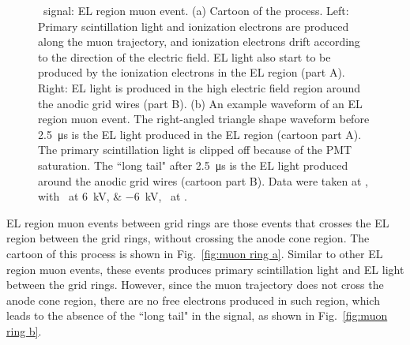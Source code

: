 \begin{figure}[!htbp]
\begin{subfigure}[b]{0.6\textwidth}
		\caption{}
		\label{fig:muon EL c}
	\end{subfigure}
\caption[\gtest\ signal: EL region muon event.]{\gtest\ signal: EL region muon event. (a) Cartoon of the process. Left: Primary scintillation light and ionization electrons are produced along the muon trajectory, and ionization electrons drift according to the direction of the electric field. EL light also start to be produced by the ionization electrons in the EL region (part A). Right: EL light is produced in the high electric field region around the anodic grid wires (part B). (b) An example waveform of an EL region muon event. The right-angled triangle shape waveform before \SI{2.5}{\us} is the EL light produced in the EL region (cartoon part A). The primary scintillation light is clipped off because of the PMT saturation. The ``long tail" after \SI{2.5}{\us} is the EL light produced around the anodic grid wires (cartoon part B). Data were taken at , with \opvtvb\ at \SIlist{+6;-6}{kV}, \opgd\ at \standarddensity .} 
	\label{fig:muon EL}
\end{figure}

EL region muon events between grid rings are those events that crosses the EL region between the grid rings, without crossing the anode cone region. The cartoon of this process is shown in Fig.~\ref{fig:muon ring a}. Similar to other EL region muon events, these events produces primary scintillation light and EL light between the grid rings. However, since the muon trajectory does not cross the anode cone region, there are no free electrons produced in such region, which leads to the absence of the ``long tail" in the signal, as shown in Fig.~\ref{fig:muon ring b}.  

